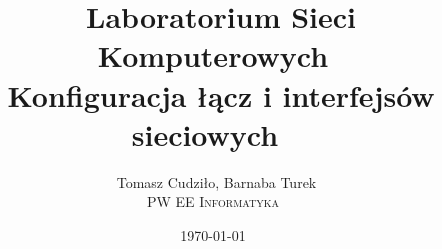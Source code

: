 \title{\
Laboratorium Sieci Komputerowych\\\
Konfiguracja łącz i interfejsów sieciowych\
}
\author{\
Tomasz Cudziło, Barnaba Turek\\
\textsc{PW EE Informatyka}\\[6pt]
}
\date{\today}

